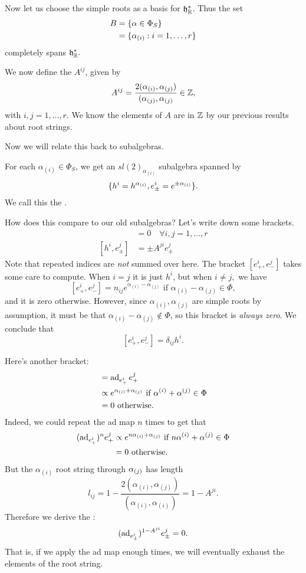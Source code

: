 Now let us choose the simple roots as a basis for $\mathfrak{h}_{\mathbb{R}}^*$. Thus the set
\begin{align*}
    B&=\{\alpha \in \Phi_S\}\\
    &= \{\alpha_{(i)}:i=1,\ldots,r\}
\end{align*}
completely spans $\mathfrak{h}_{\mathbb{R}}^*.$
\begin{defn}
We now define the  $A^{ij}$, given by
\begin{equation}\label{defn:cartan}
A^{ij} = \frac{2(\alpha_{(i)}, \alpha_{(j)})} {(\alpha_{(j)},\alpha_{(j)}}\in \mathbb{Z},
\end{equation}
with $i,j=1,\ldots,r$. We know the elements of $A$ are in $\mathbb{Z}$ by our previous results about root strings.
\end{defn}

Now we will relate this back to subalgebras. 
\begin{defn}
For each $\alpha_{(i)}\in \Phi_S$, we get an $sl(2)_{\alpha_{(i)}}$ subalgebra spanned by
$$\{h^i=h^{\alpha_{(i)}}, e^i_\pm =e^{\pm \alpha_{(i)}}\}.$$
We call this the .
\end{defn}
How does this compare to our old subalgebras? Let's write down some brackets.
\begin{align*}
    [h^i,h^j]&= 0 \quad \forall i,j=1,\ldots,r\\
    [h^i,e^j_\pm]&= \pm A^{ji} e^j_\pm
\end{align*}
Note that repeated indices are \emph{not} summed over here.
The bracket $[e_+^i,e_-^j]$ takes some care to compute. When $i=j$ it is just $h^i$, but when $i\neq j,$ we have
$$[e_+^i, e_-^j]= n_{ij} e^{\alpha_{(i)}-\alpha_{(j)}} \text{ if } \alpha_{(i)}-\alpha_{(j)}\in \Phi,$$
and it is zero otherwise. However, since $\alpha_{(i)},\alpha_{(j)}$ are simple roots by assumption, it must be that $\alpha_{(i)}-\alpha_{(j)}\notin \Phi$, so this bracket is \emph{always zero}. We conclude that
$$[e_+^i,e_-^j]=\delta_{ij}h^i.$$

Here's another bracket:
\begin{align*}
    [e_+^i,e_+^j]&= \ad_{e_+^i} e_+^j\\
    &\propto e^{\alpha_{(i)}+\alpha_{(j)}}\text{ if } \alpha^{(i)}+\alpha^{(j)}\in \Phi\\
    &= 0\text{ otherwise}.
\end{align*}
Indeed, we could repeat the ad map $n$ times to get that
\begin{align*}
    (\operatorname{ad}_{e_+^i})^n e_+^j&\propto e^{n\alpha_{(i)}+\alpha_{(j)}}\text{ if } n\alpha^{(i)}+\alpha^{(j)}\in \Phi\\
    &= 0\text{ otherwise}.
\end{align*}
But the $\alpha_{(i)}$ root string through $\alpha_{(j)}$ has length
$$l_{ij}=1-\frac{2(\alpha_{(i)},\alpha_{(j)})} {(\alpha_{(i)},\alpha_{(i)})}=1-A^{ji}.$$
Therefore we derive the :
\begin{equation}
(\operatorname{ad}_{e_\pm^i})^{1-A^{ji}}e_\pm^j =0.
\end{equation}
That is, if we apply the ad map enough times, we will eventually exhaust the elements of the root string.

